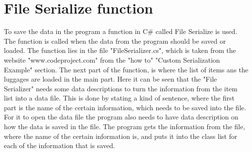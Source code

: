 \section{File Serialize function}
To save the data in the program a function in C# called File Serialize is used. The function is called when the data from the program should be saved or loaded. The function lies in the file "FileSerializer.cs", which is taken from the website "www.codeproject.com" from the "how to" "Custom Serialization Example" section. The next part of the function, is where the list of items ans the luggages are loaded in the main part. 
Here it can be seen that the "File Serializer" needs some data descriptions to turn the information from the item list into a data file. 
This is done by stating a kind of sentence, where the first part is the name of the certain information, which needs to be saved into the file. 
For it to open the data file the program also needs to have data description on how the data is saved in the file. The program gets the information from the file, where the name of the certain information is, and puts it into the class list for each of the information that is saved.